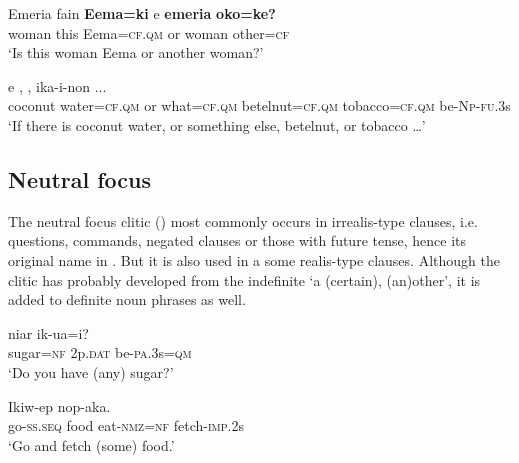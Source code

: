 \ea%
\label{ex:x1718}
\gll Emeria  fain  \textbf{Eema=ki} e  \textbf{emeria} \textbf{oko=ke?}\\
woman  this  Eema=\textsc{cf}.\textsc{qm}  or  woman  other=\textsc{cf}\\
\glt`Is this woman Eema or another woman?'
\z


\ea%
\label{ex:x1717}
\gll {}     e  ,  ,   ika-i-non  ...\\
coconut  water=\textsc{cf}.\textsc{qm}  or  what=\textsc{cf}.\textsc{qm}  betelnut=\textsc{cf}.\textsc{qm} tobacco=\textsc{cf}.\textsc{qm}  be-\textsc{Np}-\textsc{fu}.3s     \\
\glt`If there is coconut water, or something else, betelnut, or tobacco {\dots}'
\z


\subsection{Neutral focus} 

The neutral focus clitic () most commonly occurs in irrealis-type clauses, i.e. questions, commands, negated clauses or those with future tense, hence its original name in \citet{Jarvinen1988b}. But it is also used in a some realis-type clauses. Although the clitic has probably developed from the indefinite  `a (certain), (an)other', it is added to definite noun phrases as well. 

\ea%
\label{ex:x1719}
\gll {}  niar  ik-ua=i? \\
sugar=\textsc{nf}  2p.\textsc{dat}  be-\textsc{pa}.3s=\textsc{qm}      \\
\glt`Do you have (any) sugar?'
\z


\ea%
\label{ex:x1720}
\gll Ikiw-ep     nop-aka.\\
go-\textsc{ss}.\textsc{seq}  food  eat-\textsc{nmz}=\textsc{nf}  fetch-\textsc{imp}.2s\\
\glt`Go and fetch (some) food.'
\z


